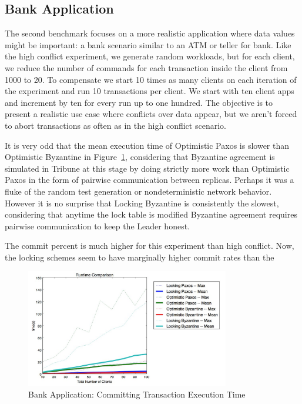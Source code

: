 \documentclass[10pt,twocolumn]{article}
\begin{document}
\subsection{Bank Application}

The second benchmark focuses on a more realistic application where data values might be important: a bank scenario similar to an ATM or teller for bank. Like the high conflict experiment, we generate random workloads, but for each client, we reduce the number of commands for each transaction inside the client from 1000 to 20. To compensate we start 10 times as many clients on each iteration of the experiment and run 10 transactions per client. We start with ten client apps and increment by ten for every run up to one hundred. The objective is to present a realistic use case where conflicts over data appear, but we aren't forced to abort transactions as often as in the high conflict scenario.



It is very odd that the mean execution time of Optimistic Paxos is slower than Optimistic Byzantine in Figure~\ref{2-time}, considering that Byzantine agreement is simulated in Tribune at this stage by doing strictly more work than Optimistic Paxos in the form of pairwise communication between replicas. Perhaps it was a fluke of the random test generation or nondeterministic network behavior. However it is no surprise that Locking Byzantine is consistently the slowest, considering that anytime the lock table is modified Byzantine agreement requires pairwise communication to keep the Leader honest.

The commit percent is much higher for this experiment than high conflict. Now, the locking schemes seem to have marginally higher commit rates than the 

\begin{figure}[!b]
  \begin{center}
    \includegraphics[width=3.5in]{Images/2-time.png}
  \end{center}

  \caption{\small Bank Application: Committing Transaction Execution Time }
  \label{2-time}
\end{figure}
\end{document}
